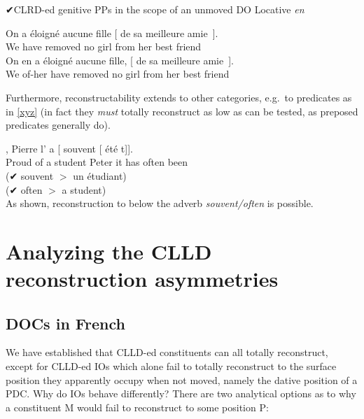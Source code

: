 \documentclass[output=paper]{langsci/langscibook}
\begin{document}
\begin{exe}
    \ex ✔\gls{CLRD}-ed genitive
PPs in the scope of an unmoved DO \hfill{Locative {\it en}}
    \begin{xlist}
    \ex
	\gll      On     a   \'{e}loign\'{e}  aucune fille [ de
    sa   meilleure amie~].\\
    We   have   removed   no girl {}  from her   best        friend\\
    \ex
    \gll On  en   a   \'{e}loign\'{e}  aucune fille, [ de sa   meilleure amie~].\\
    We   of-her have   removed   no girl {} from her   best        friend  \\
    \end{xlist}
\end{exe}
%
Furthermore, reconstructability extends to other categories, e.g.\ to
predicates as in \eqref{xyz} (in fact they {\it must} totally reconstruct as low
as can be tested, as preposed predicates generally do).

\ea \label{xyz}
,    Pierre
l' a     [ souvent [ \'{e}t\'{e} t]].\\
{}  Proud of a student      Peter  it has  {} often {} been	{}\\
\sn \gll
    (✔ souvent $>$ un \'{e}tudiant)\\
    (✔ often $>$ a student)\\
\z
%
As shown, reconstruction to below the adverb {\it souvent/often} is possible.

\section{Analyzing the CLLD reconstruction asymmetries}

\subsection{\glspl{DOC} in French}

We have established that \gls{CLLD}-ed constituents can all totally
reconstruct,  except for \gls{CLLD}-ed \glspl{IO} which alone fail to totally
reconstruct to the surface position they apparently occupy when not moved,
namely the dative position of a \gls{PDC}. Why do \glspl{IO} behave
differently?  There are two analytical options as to  why a constituent M would
fail to reconstruct to some position P:
\end{document}
